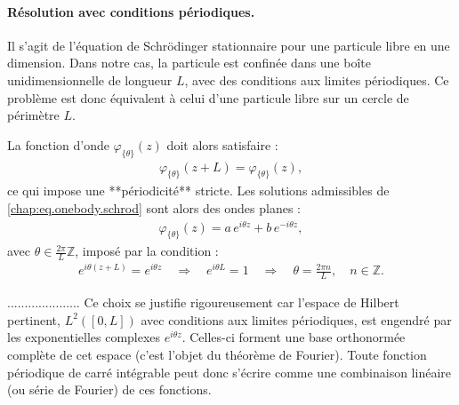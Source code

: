 



\paragraph{Résolution avec conditions périodiques.}

Il s'agit de l’équation de Schrödinger stationnaire pour une particule libre en une dimension. Dans notre cas, la particule est confinée dans une boîte unidimensionnelle de longueur $L$, avec des conditions aux limites périodiques. Ce problème est donc équivalent à celui d’une particule libre sur un cercle de périmètre $L$.

La fonction d’onde $\varphi_{\{\theta\}}(z)$ doit alors satisfaire :
\begin{eqnarray}
	\varphi_{\{\theta\}}(z+L) = \varphi_{\{\theta\}}(z),
\end{eqnarray}
ce qui impose une **périodicité** stricte. Les solutions admissibles de \eqref{chap:eq.onebody.schrod} sont alors des ondes planes :
\begin{eqnarray}
	\varphi_{\{\theta\}}(z) = a\,e^{i \theta z} + b\,e^{-i \theta z},
\end{eqnarray}
avec $\theta \in \frac{2\pi}{L} \mathbb{Z}$, imposé par la condition :
\begin{eqnarray}
	e^{i \theta(z+L)} = e^{i \theta z} \quad \Rightarrow \quad e^{i \theta L} = 1 \quad \Rightarrow \quad \theta = \frac{2\pi n}{L}, \quad n \in \mathbb{Z}.
\end{eqnarray}

.....................
Ce choix se justifie rigoureusement car l’espace de Hilbert pertinent, \( L^2([0,L]) \) avec conditions aux limites périodiques, est engendré par les exponentielles complexes \( e^{i \theta z} \). Celles-ci forment une base orthonormée complète de cet espace (c’est l’objet du théorème de Fourier). Toute fonction périodique de carré intégrable peut donc s’écrire comme une combinaison linéaire (ou série de Fourier) de ces fonctions.

